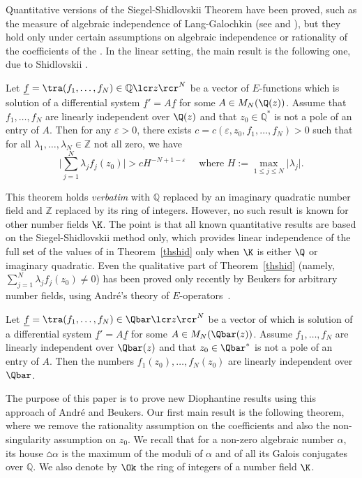 Quantitative versions of the Siegel-Shidlovskii Theorem have been proved, such as the measure of algebraic independence of Lang-Galochkin (see \cite[p.\,238, Th.\,5.29 \& remarks]{EMS} and \cite[Ch.\,11]{Shidlovskiilivre}), but they hold only under certain assumptions on algebraic independence or rationality of the coefficients of the \Efunctions.
In the linear setting, the main result is the following one, due to Shidlovskii \cite[p.\,358, Th.\,1, Eq.\,(32)]{Shidlovskiilivre}.
\begin{thmx}[Shidlovskii] \label{thshid}
Let $\underline f = \tra (f_1,\ldots, f_N) \in \mathbb{Q}\lcr z\rcr^N$ be a vector of $E$\nobreakdash-func\-tions which is solution of a differential system $\underline f '=A\underline f $ for some $A\in M_N(\Q(z))$. Assume that $f_1,\ldots, f_N$ are linearly independent over $\Q(z)$ and that $z_0\in \mathbb Q^*$ is not a pole of an entry of $A$. Then for any $\varepsilon>0$, there exists $c=c(\varepsilon,z_0,f_1,\ldots,f_N)>0$ such that for all $\lambda_1, \ldots, \lambda_N \in \mathbb Z$ not all zero, we have
\[
\bigg\vert \sum_{j=1}^N \lambda_j f_j(z_0)\bigg\vert > c H^{-N+1-\varepsilon} \quad\mbox{ where } H:=\max_{1\leq j \leq N}\vert\lambda_j\vert.
\]
\end{thmx}
This theorem holds {\em verbatim} with $\mathbb Q$ replaced by an imaginary quadratic number field and $\mathbb Z$ replaced by its ring of integers. However, no such result is known for other number fields $\K$. The point is that all known quantitative results are based on the Siegel-Shidlovskii method only, which provides linear independence of the full set of the values of \Efunctions in Theorem~\ref{thshid} only when $\K$ is either $\Q$ or imaginary quadratic. Even the qualitative part of Theorem~\ref{thshid} (namely, $\sum_{j=1}^N \lambda_j f_j(z_0)\neq 0 $) has been proved only recently by Beukers \cite[Cor.\,1.4]{beukers} for arbitrary number fields, using André's theory of $E$-operators~\cite{andre}.
\begin{thmx}[Beukers] \label{thbeukers}
Let $\underline f = \tra (f_1,\ldots, f_N) \in \Qbar\lcr z\rcr^N$ be a vector of \Efunctions which is solution of a differential system $\underline f '=A\underline f $ for some $A\in M_N(\Qbar(z))$. Assume $f_1,\ldots, f_N$ are linearly independent over $\Qbar(z)$ and that $z_0\in \Qbar^*$ is not a pole of an entry of $A$. Then the numbers $f_1(z_0),\ldots, f_N(z_0)$ are linearly independent over $\Qbar$.
\end{thmx}

The purpose of this paper is to prove new Diophantine results using this approach of André and Beukers.
Our first main result is the following theorem, where we remove the rationality assumption on the coefficients and also the non-singularity assumption on $z_0$. We recall that for a non-zero algebraic number $\alpha$, its house $\house{\alpha}$ is the maximum of the moduli of $\alpha$ and of all its
Galois conjugates over $\mathbb Q$. We also denote by $\Ok$ the ring of integers of a number field $\K$.

